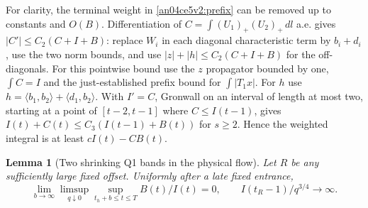 \documentclass[11pt]{article}
\newtheorem{lemma}{Lemma}
\newcommand{\dd}{\,dl}
\begin{document}
For clarity, the terminal weight in \eqref{an04ce5v2:prefix} can be removed
up to constants and $O(B)$. Differentiation of
$C=\int(U_1)_+(U_2)_+\dd$ a.e. gives $|C'|\le C_2(C+I+B)$:
replace $W_i$ in each diagonal characteristic term by $b_i+d_i$,
use the two norm bounds, and use
$|z|+|h|\le C_2(C+I+B)$ for the off-diagonals. For this pointwise bound use the $z$ propagator bounded by one, $\int C=I$ and the just-established prefix bound for $\int|T_1 x|$. For $h$ use $h=\langle b_1,b_2\rangle+\langle d_1,b_2\rangle$.
With $I'=C$, Gronwall on an interval of length at most two,
starting at a point of $[t-2,t-1]$ where $C\le I(t-1)$, gives
$I(t)+C(t)\le C_3(I(t-1)+B(t))$ for $s\ge2$. Hence the weighted integral
is at least $cI(t)-CB(t)$.

\begin{lemma}[Two shrinking Q1 bands in the physical flow]\label{an04ce5v2:bandlemma}
Let $R$ be any sufficiently large fixed offset. Uniformly after a late fixed entrance,
\begin{equation}\label{an04ce5v2:uniform}
 \lim_{b\to\infty}\limsup_{q\downarrow0}\sup_{t_h+b\le t\le T} B(t)/I(t)=0 ,
 \qquad I(t_R-1)/q^{3/4}\longrightarrow\infty .
\end{equation}
\end{lemma}
\end{document}
